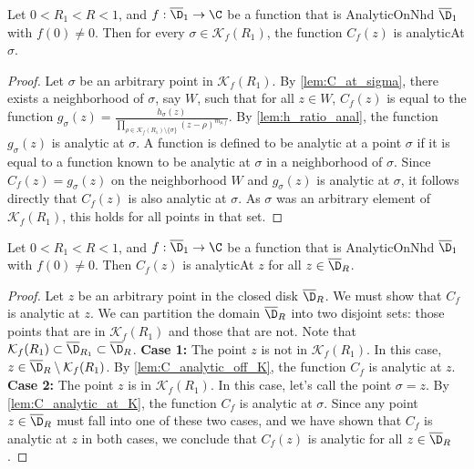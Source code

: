 \begin{lemma}[C analytic at K]\label{lem:C_analytic_at_K} \leanok {}
Let $0<R_1<R<1$, and $f:\overline{\D}_1\to\C$ be a function that is AnalyticOnNhd $\overline{\D}_1$ with $f(0)\neq0$. Then for every $\sigma \in \mathcal{K}_f(R_1)$, the function $C_f(z)$ is analyticAt $\sigma$.
\end{lemma}
\begin{proof}
\leanok
Let $\sigma$ be an arbitrary point in $\mathcal{K}_f(R_1)$.
By \cref{lem:C_at_sigma}, there exists a neighborhood of $\sigma$, say $W$, such that for all $z \in W$, $C_f(z)$ is equal to the function $g_\sigma(z) = \frac{h_\sigma(z)}{\prod_{\rho\in\mathcal{K}_f(R_1) \setminus\{\sigma\}}(z-\rho)^{m_{\rho,f}}}$.
By \cref{lem:h_ratio_anal}, the function $g_\sigma(z)$ is analytic at $\sigma$.
A function is defined to be analytic at a point $\sigma$ if it is equal to a function known to be analytic at $\sigma$ in a neighborhood of $\sigma$.
Since $C_f(z) = g_\sigma(z)$ on the neighborhood $W$ and $g_\sigma(z)$ is analytic at $\sigma$, it follows directly that $C_f(z)$ is also analytic at $\sigma$.
As $\sigma$ was an arbitrary element of $\mathcal{K}_f(R_1)$, this holds for all points in that set.
\end{proof}

\begin{lemma}[C is analytic]\label{lem:C_is_analytic} \leanok {}
Let $0<R_1<R<1$, and $f:\overline{\D}_1\to\C$ be a function that is AnalyticOnNhd $\overline{\D}_1$ with $f(0)\neq0$. Then $C_f(z)$ is analyticAt $z$ for all $z \in \overline{\D}_R$.
\end{lemma}
\begin{proof}
\leanok
{}
Let $z$ be an arbitrary point in the closed disk $\overline{\D}_R$. We must show that $C_f$ is analytic at $z$.
We can partition the domain $\overline{\D}_R$ into two disjoint sets: those points that are in $\mathcal{K}_f(R_1)$ and those that are not. Note that $\mathcal{K}_f(R_1) \subset \overline{\D}_{R_1} \subset \overline{\D}_R$.
\textbf{Case 1:} The point $z$ is not in $\mathcal{K}_f(R_1)$.
In this case, $z \in \overline{\D}_R \setminus \mathcal{K}_f(R_1)$. By \cref{lem:C_analytic_off_K}, the function $C_f$ is analytic at $z$.
\textbf{Case 2:} The point $z$ is in $\mathcal{K}_f(R_1)$.
In this case, let's call the point $\sigma = z$. By \cref{lem:C_analytic_at_K}, the function $C_f$ is analytic at $\sigma$.
Since any point $z \in \overline{\D}_R$ must fall into one of these two cases, and we have shown that $C_f$ is analytic at $z$ in both cases, we conclude that $C_f(z)$ is analytic for all $z \in \overline{\D}_R$.
\end{proof}




